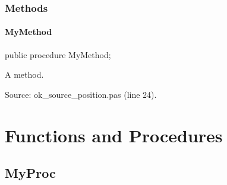 \documentclass{report}
\newif\ifpdf
\begin{document}
\subsubsection*{\large{\textbf{Methods}}\normalsize\hspace{1ex}\hfill}
\paragraph*{MyMethod}\hspace*{\fill}

\label{ok_source_position.TMyClass-MyMethod}
\begin{list}{}{
\setlength{\itemindent}{0cm}
\setlength{\listparindent}{0cm}
\setlength{\leftmargin}{\evensidemargin}
\addtolength{\leftmargin}{\tmplength}
\settowidth{\labelsep}{X}
\addtolength{\leftmargin}{\labelsep}
\setlength{\labelwidth}{\tmplength}
}
\item[\textbf{Declaration}\hfill]
\ifpdf
\begin{flushleft}
\fi
\begin{ttfamily}
public procedure MyMethod;\end{ttfamily}

\ifpdf
\end{flushleft}
\fi

\par
\item[\textbf{Description}]
A method.\par
Source: ok{\_}source{\_}position.pas (line 24).

\end{list}
\section{Functions and Procedures}
\ifpdf
\subsection*{\large{\textbf{MyProc}}\normalsize\hspace{1ex}\hrulefill}
\else
\end{document}
